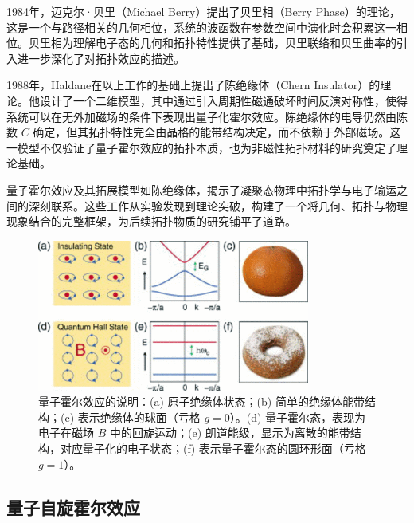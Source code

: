 1984年，迈克尔·贝里（Michael Berry）提出了贝里相（Berry Phase）的理论\cite{d4}，这是一个与路径相关的几何相位，系统的波函数在参数空间中演化时会积累这一相位。贝里相为理解电子态的几何和拓扑特性提供了基础，贝里联络和贝里曲率的引入进一步深化了对拓扑效应的描述。

1988年，Haldane在以上工作的基础上提出了陈绝缘体（Chern Insulator）的理论\cite{d5}。他设计了一个二维模型，其中通过引入周期性磁通破坏时间反演对称性，使得系统可以在无外加磁场的条件下表现出量子化霍尔效应。陈绝缘体的电导仍然由陈数 \( C \) 确定，但其拓扑特性完全由晶格的能带结构决定，而不依赖于外部磁场。这一模型不仅验证了量子霍尔效应的拓扑本质，也为非磁性拓扑材料的研究奠定了理论基础。

量子霍尔效应及其拓展模型如陈绝缘体，揭示了凝聚态物理中拓扑学与电子输运之间的深刻联系。这些工作从实验发现到理论突破，构建了一个将几何、拓扑与物理现象结合的完整框架，为后续拓扑物质的研究铺平了道路。

\begin{figure}[h!]
    \centering
    \includegraphics[width=0.8\textwidth]{images/fig1-2.png} 
    \caption{量子霍尔效应的说明：(a) 原子绝缘体状态；(b) 简单的绝缘体能带结构；(c) 表示绝缘体的球面（亏格 \( g=0 \)）。(d) 量子霍尔态，表现为电子在磁场 \( B \) 中的回旋运动；(e) 朗道能级，显示为离散的能带结构，对应量子化的电子状态；(f) 表示量子霍尔态的圆环形面（亏格 \( g=1 \)）。\cite{r11}}
    \label{fig_1_2}
\end{figure}


\subsection{量子自旋霍尔效应}


